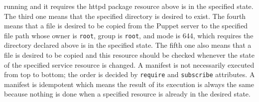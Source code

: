 \documentclass[12pt]{report}
\begin{document}
running and it requires the httpd package resource above is in the
specified state. The third one means that the specified directory is
desired to exist. The fourth means that a file is desired to be
copied from the Puppet server to the specified file path whose owner
is {\tt root}, group is {\tt root}, and mode is 644, which requires
the directory declared above is in the specified state.  The fifth one
also means that a file is desired to be copied and this resource
should be checked whenever the state of the specified service resource
is changed. A manifest is not necessarily executed from top to bottom;
the order is decided by {\tt require} and {\tt subscribe}
attributes. A manifest is idempotent which means the result of its
execution is always the same because nothing is done when a specified
resource is already in the desired state.
\end{document}
